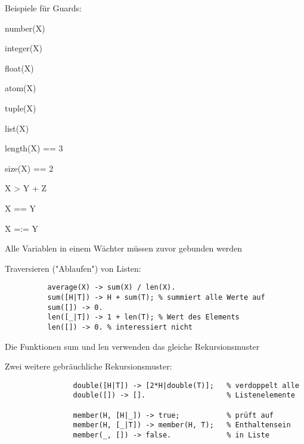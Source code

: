 \documentclass[10pt]{article}
\begin{document}
\begin{itemize*}
\begin{itemize*}
\begin{itemize*}
    \end{itemize*}
    \item Beispiele für Guards:
    \begin{itemize*}
      \item number(X)       %
      \item integer(X)      %
      \item float(X)        %
      \item atom(X)         %
      \item tuple(X)        %
      \item list(X)         %
      \item length(X) == 3  %
      \item size(X) == 2    %
      \item X > Y + Z       %
      \item X == Y          %
      \item X =:= Y         %
    \end{itemize*}
    \item Alle Variablen in einem Wächter müssen zuvor gebunden werden
  \end{itemize*}
\end{itemize*}

Traversieren ("Ablaufen") von Listen:
\begin{lstlisting}
          average(X) -> sum(X) / len(X).
          sum([H|T]) -> H + sum(T); % summiert alle Werte auf
          sum([]) -> 0.
          len([_|T]) -> 1 + len(T); % Wert des Elements
          len([]) -> 0. % interessiert nicht
\end{lstlisting}
\begin{itemize*}
  \item Die Funktionen sum und len verwenden das gleiche Rekursionsmuster
  \item Zwei weitere gebräuchliche Rekursionsmuster:
  \begin{lstlisting}
                double([H|T]) -> [2*H|double(T)];   % verdoppelt alle
                double([]) -> [].                   % Listenelemente
                
                member(H, [H|_]) -> true;           % prüft auf
                member(H, [_|T]) -> member(H, T);   % Enthaltensein
                member(_, []) -> false.             % in Liste
      \end{lstlisting}
\end{itemize*}
\end{document}
